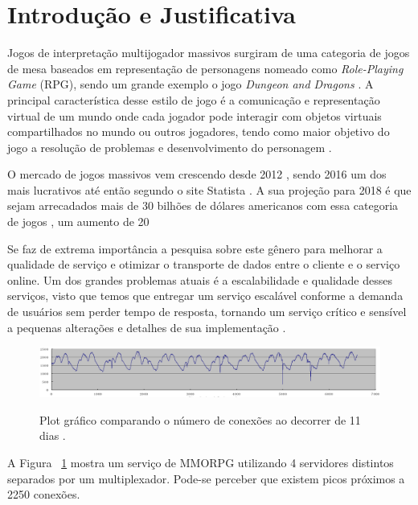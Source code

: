 \section{Introdução e Justificativa}
\label{sec:int}

Jogos de interpretação multijogador massivos surgiram de uma categoria de jogos de mesa baseados em representação de personagens nomeado como \textit{Role-Playing Game} (RPG), sendo um grande exemplo o jogo \textit{Dungeon and Dragons} \cite{tsr1980dungeons}. A principal característica desse estilo de jogo é a comunicação e representação virtual de um mundo onde cada jogador pode interagir com objetos virtuais compartilhados no mundo ou outros jogadores, tendo como maior objetivo do jogo a resolução de problemas e desenvolvimento do personagem \cite{video_game_technologies}.

O mercado de jogos massivos vem crescendo desde 2012 \cite{new_york_times}, sendo 2016 um dos mais lucrativos até então segundo o site Statista \cite{statista_2016}. A sua projeção para 2018 é que sejam arrecadados mais de 30 bilhões de dólares americanos com essa categoria de jogos \cite{statista_2018}, um aumento de 20%

Se faz de extrema importância a pesquisa sobre este gênero para melhorar a qualidade de serviço e otimizar o transporte de dados entre o cliente e o serviço online. Um dos grandes problemas atuais é a escalabilidade e qualidade desses serviços, visto que temos que entregar um serviço escalável conforme a demanda de usuários sem perder tempo de resposta, tornando um serviço crítico e sensível a pequenas alterações e detalhes de sua implementação \cite{cloud_fog}.

\begin{figure}[h]
\caption{Plot gráfico comparando o número de conexões ao decorrer de 11 dias
\cite{system_performance}.}
\centering
\includegraphics[width=1\textwidth]{img/connection_peer_hour.png}
\label{fig:conection_peer_hour}
\end{figure}

A Figura ~\ref{fig:conection_peer_hour} mostra um serviço de MMORPG utilizando 4 servidores distintos separados por um multiplexador. Pode-se perceber que existem picos próximos a 2250 conexões.

